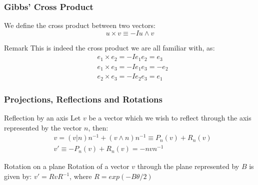 \documentclass{beamer}
\begin{document}
\begin{frame}
\frametitle{Gibbs' Cross Product}
    \begin{definition}
        We define the cross product between two vectors:
        \[u \times v \equiv -Iu\wedge v\]
    \end{definition}
    \begin{block}{Remark}
        This is indeed the cross product we are all familiar with, as:
        \begin{align*}
            &e_1\times e_2 = -Ie_1e_2 = e_3 \\
            &e_1\times e_3 = -Ie_1e_3 = -e_2 \\
            &e_2\times e_3 = -Ie_2e_3 = e_1
        \end{align*}
    \end{block}
\end{frame}

\begin{frame}
\frametitle{Projections, Reflections and Rotations}
\begin{block}{Reflection by an axis}
    Let $v$ be a vector which we wish to reflect through the axis represented by the vector $n$, then:
    \begin{align*}
        &v = (v|n)n^{-1} + (v\wedge n)n^{-1} \equiv P_n(v) + R_n(v)\\
        &v' \equiv -P_n(v) + R_n(v) = -nvn^{-1}
    \end{align*}
\end{block}
\begin{block}{Rotation on a plane}
    Rotation of a vector $v$ through the plane represented by $B$ is given by: $v' = RvR^{-1}$, where $R = exp(-B\theta/2)$
\end{block}
\end{frame}
\end{document}
